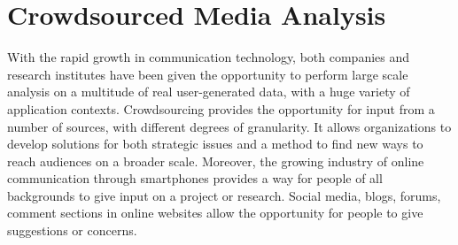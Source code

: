\chapter{Crowdsourced Media Analysis}
With the rapid growth in communication technology, both companies and research institutes have been given the opportunity to perform large scale analysis on a multitude of real user-generated data, with a huge variety of application contexts.
Crowdsourcing provides the opportunity for input from a number of sources, with different degrees of granularity. It allows organizations to develop solutions for both strategic issues and a method to find new ways to reach audiences on a broader scale. Moreover, the growing industry of online communication through smartphones provides a way for people of all backgrounds to give input on a project or research.
Social media, blogs, forums, comment sections in online websites allow the opportunity for people to give suggestions or concerns.

